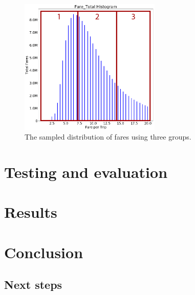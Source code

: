 \documentclass[a4paper]{article}
\begin{document}
\begin{figure}
  \centering
  \includegraphics[width=0.6\textwidth]{images/distribution-fares-sampled.png}
  \caption{The sampled distribution of fares using three groups.}
  \label{fig:distribution-fares-sampled}
\end{figure}


\section{Testing and evaluation}

\section{Results}

\section{Conclusion}
\subsection{Next steps}
\end{document}
